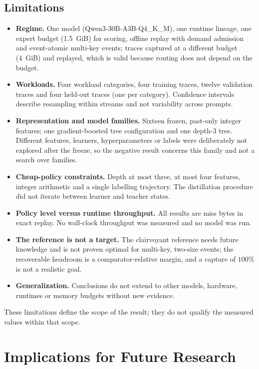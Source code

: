 \documentclass[11pt]{article}
\theoremstyle{plain}
\theoremstyle{definition}
\begin{document}
\subsection{Limitations}
\begin{itemize}
\item \textbf{Regime.} One model (Qwen3-30B-A3B-Q4\_K\_M), one runtime lineage, one expert budget (1.5~GiB) for scoring, offline replay with demand admission and event-atomic multi-key events; traces captured at a different budget (4~GiB) and replayed, which is valid because routing does not depend on the budget.
\item \textbf{Workloads.} Four workload categories, four training traces, twelve validation traces and four held-out traces (one per category). Confidence intervals describe resampling within streams and not variability across prompts.
\item \textbf{Representation and model families.} Sixteen frozen, past-only integer features; one gradient-boosted tree configuration and one depth-3 tree. Different features, learners, hyperparameters or labels were deliberately not explored after the freeze, so the negative result concerns this family and not a search over families.
\item \textbf{Cheap-policy constraints.} Depth at most three, at most four features, integer arithmetic and a single labelling trajectory. The distillation procedure did not iterate between learner and teacher states.
\item \textbf{Policy level versus runtime throughput.} All results are miss bytes in exact replay. No wall-clock throughput was measured and no model was run.
\item \textbf{The reference is not a target.} The clairvoyant reference needs future knowledge and is not proven optimal for multi-key, two-size events; the recoverable headroom is a comparator-relative margin, and a capture of $100\%$ is not a realistic goal.
\item \textbf{Generalization.} Conclusions do not extend to other models, hardware, runtimes or memory budgets without new evidence.
\end{itemize}
These limitations define the scope of the result; they do not qualify the measured values within that scope.

\section{Implications for Future Research}
\label{sec:future}
\end{document}
